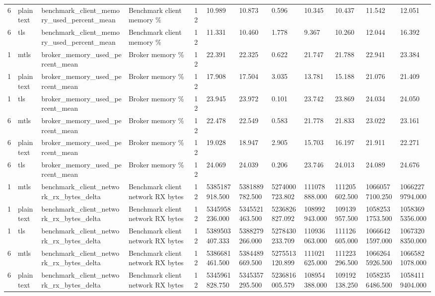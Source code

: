 \begin{longtable}{llllllllllll}
6 & plaintext & benchmark\_client\_memory\_used\_percent\_mean & Benchmark client memory \% & 12 & 10.989 & 10.873 & 0.596 & 10.345 & 10.437 & 11.542 & 12.051 \\
6 & tls & benchmark\_client\_memory\_used\_percent\_mean & Benchmark client memory \% & 12 & 11.331 & 10.460 & 1.778 & 9.367 & 10.260 & 12.044 & 16.392 \\
1 & mtls & broker\_memory\_used\_percent\_mean & Broker memory \% & 12 & 22.391 & 22.325 & 0.622 & 21.747 & 21.788 & 22.941 & 23.384 \\
1 & plaintext & broker\_memory\_used\_percent\_mean & Broker memory \% & 12 & 17.908 & 17.504 & 3.035 & 13.781 & 15.188 & 21.076 & 21.409 \\
1 & tls & broker\_memory\_used\_percent\_mean & Broker memory \% & 12 & 23.945 & 23.972 & 0.101 & 23.742 & 23.869 & 24.034 & 24.050 \\
6 & mtls & broker\_memory\_used\_percent\_mean & Broker memory \% & 12 & 22.478 & 22.549 & 0.583 & 21.778 & 21.833 & 23.022 & 23.161 \\
6 & plaintext & broker\_memory\_used\_percent\_mean & Broker memory \% & 12 & 19.028 & 18.947 & 2.905 & 15.703 & 16.197 & 21.911 & 22.271 \\
6 & tls & broker\_memory\_used\_percent\_mean & Broker memory \% & 12 & 24.069 & 24.039 & 0.206 & 23.746 & 24.013 & 24.089 & 24.676 \\
1 & mtls & benchmark\_client\_network\_rx\_bytes\_delta & Benchmark client network RX bytes & 12 & 5385187918.500 & 5381889782.500 & 5274000723.802 & 111078888.000 & 111205602.500 & 10660577100.250 & 10662279794.000 \\
1 & plaintext & benchmark\_client\_network\_rx\_bytes\_delta & Benchmark client network RX bytes & 12 & 5345958236.000 & 5345521463.500 & 5236826827.092 & 108992943.000 & 109139957.500 & 10582531753.500 & 10583695356.000 \\
1 & tls & benchmark\_client\_network\_rx\_bytes\_delta & Benchmark client network RX bytes & 12 & 5389503407.333 & 5388279266.000 & 5278430233.709 & 110936063.000 & 111126605.000 & 10666421597.000 & 10673208350.000 \\
6 & mtls & benchmark\_client\_network\_rx\_bytes\_delta & Benchmark client network RX bytes & 12 & 5386681461.500 & 5384489669.500 & 5275513120.899 & 111021625.000 & 111223296.500 & 10662645926.500 & 10665821078.000 \\
6 & plaintext & benchmark\_client\_network\_rx\_bytes\_delta & Benchmark client network RX bytes & 12 & 5345961828.750 & 5345357295.500 & 5236816005.579 & 108954388.000 & 109192138.250 & 10582356486.500 & 10584119404.000 \\

\end{longtable}
